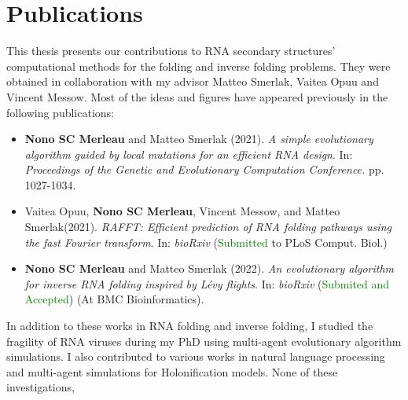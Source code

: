 \chapter*{Publications}
This thesis presents our contributions to RNA secondary structures' computational methods for the folding and inverse folding problems. They were obtained in collaboration with my advisor Matteo Smerlak, Vaitea Opuu and Vincent Messow. Most of the ideas and figures have appeared previously in the following publications: 


\begin{itemize}
	
	\item \cite{merleau2021simple} \textbf{Nono SC Merleau} and Matteo Smerlak (2021). \emph{A simple evolutionary algorithm guided by local mutations for an efficient RNA design}. In: \textit{Proceedings of the Genetic and Evolutionary Computation Conference.} pp. 1027-1034. %
	
	\item  \cite{opuu2021rafft} Vaitea Opuu, \textbf{Nono SC Merleau}, Vincent Messow, and Matteo Smerlak(2021). \emph{RAFFT: Efficient prediction of RNA folding pathways using the fast Fourier transform}. In: \textit{bioRxiv} (\textcolor{green}{Submitted} to PLoS Comput. Biol.)
	
	\item \cite{merleau2022evolutionary} \textbf{Nono SC Merleau}  and Matteo Smerlak (2022). \emph{An evolutionary algorithm for inverse RNA folding inspired by Lévy flights}. In: \textit{bioRxiv} (\textcolor{green}{Submited and Accepted}) (At BMC Bioinformatics). 
\end{itemize}
In addition to these works in RNA folding and inverse folding, I studied the fragility of RNA viruses during my PhD using multi-agent evolutionary algorithm simulations. I also contributed to various works in natural language processing and multi-agent simulations for Holonification models. 
None of these investigations,

